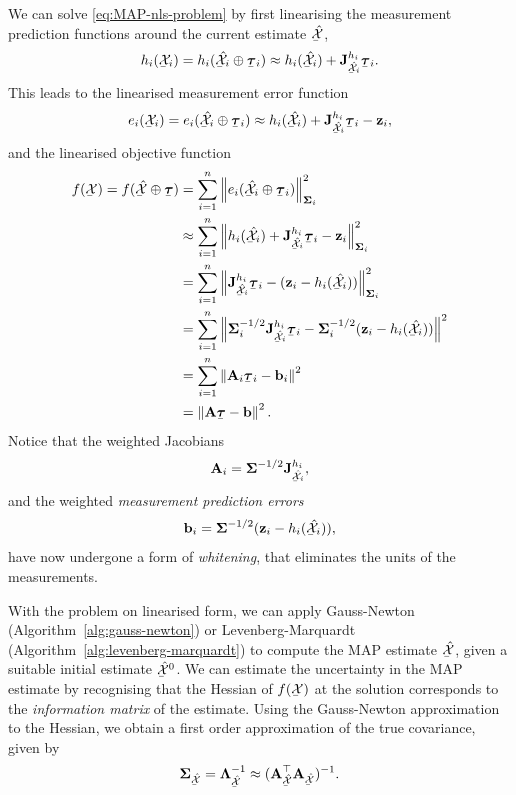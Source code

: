 We can solve \eqref{eq:MAP-nls-problem} by first linearising the measurement prediction functions around the current estimate $\ubar{\hat{\cX}}$,
\begin{equation}
  h_i(\ubar{\cX}_i) = h_i(\ubar{\hat{\cX}}_i \oplus \ubar{\vectau}_i) \approx h_i(\ubar{\hat{\cX}}_i) + \jac{h_i}{\ubar{\hat{\cX}}_i} \ubar{\vectau}_i.
\end{equation}
This leads to the linearised measurement error function
\begin{equation}
  e_i(\ubar{\cX}_i) = e_i(\ubar{\hat{\cX}}_i \oplus \ubar{\vectau}_i) \approx h_i(\ubar{\hat{\cX}}_i) + \jac{h_i}{\ubar{\hat{\cX}}_i} \ubar{\vectau}_i - \vecz_i,
\end{equation}
and the linearised objective function 
\begin{equation} \label{eq:MAP-linearised-objective-function}
\begin{split}
    f(\ubar{\cX}) = f(\ubar{\hat{\cX}} \oplus \ubar{\vectau}) &= \sum^n_{i=1} \norm{e_i(\ubar{\hat{\cX}}_i \oplus \ubar{\vectau}_i)}^2_{\matSigma_i}\\
    &\approx \sum^n_{i=1} \norm{h_i(\ubar{\hat{\cX}}_i) + \jac{h_i}{\ubar{\hat{\cX}}_i} \ubar{\vectau}_i - \vecz_i}^2_{\matSigma_i}\\
    &= \sum^n_{i=1} \norm{\jac{h_i}{\ubar{\hat{\cX}}_i} \ubar{\vectau}_i - (\vecz_i - h_i(\ubar{\hat{\cX}}_i))}^2_{\matSigma_i}\\
    &= \sum^n_{i=1} \norm{\matSigma^{-1/2}_i \jac{h_i}{\ubar{\hat{\cX}}_i} \ubar{\vectau}_i - \matSigma^{-1/2}_i(\vecz_i - h_i(\ubar{\hat{\cX}}_i))}^2\\
    &= \sum^n_{i=1} \norm{\matA_i \ubar{\vectau}_i - \vecb_i}^2\\
    &= \norm{\matA \ubar{\vectau} - \vecb}^2.
\end{split}
\end{equation}
Notice that the weighted Jacobians
\begin{equation}
  \matA_i = \matSigma^{-1/2} \jac{h_i}{\ubar{\hat{\cX}}_i},
\end{equation}
and the weighted \emph{measurement prediction errors}
\begin{equation}
  \vecb_i =  \matSigma^{-1/2}(\vecz_i - h_i(\ubar{\hat{\cX}}_i)),
\end{equation}
have now undergone a form of \emph{whitening}, that eliminates the units of the measurements.

With the problem on linearised form, we can apply Gauss-Newton (Algorithm~\ref{alg:gauss-newton}) or Levenberg-Marquardt (Algorithm~\ref{alg:levenberg-marquardt}) to compute the MAP estimate $\ubar{\hat{\cX}}$, given a suitable initial estimate $\ubar{\hat{\cX}}^0$.
We can estimate the uncertainty in the MAP estimate by recognising that the Hessian of $f(\ubar{\cX})$ at the solution corresponds to the \emph{information matrix} of the estimate.
Using the Gauss-Newton approximation to the Hessian, we obtain a first order approximation of the true covariance, given by
\begin{equation}
  \matSigma_{\ubar{\hat{\cX}}} = \matLambda_{\ubar{\hat{\cX}}}^{-1} \approx (\matA_{\ubar{\hat{\cX}}}\trans \matA_{\ubar{\hat{\cX}}})^{-1}.
\end{equation}

